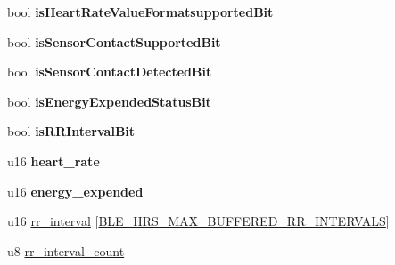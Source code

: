 \begin{DoxyCompactItemize}
\item 
bool {\bfseries is\+Heart\+Rate\+Value\+Formatsupported\+Bit}\hypertarget{struct_b_l_e___h_r_s___measurement_a223f4878ad708b9d3706e098b515df88}{}\label{struct_b_l_e___h_r_s___measurement_a223f4878ad708b9d3706e098b515df88}

\item 
bool {\bfseries is\+Sensor\+Contact\+Supported\+Bit}\hypertarget{struct_b_l_e___h_r_s___measurement_a6e348ad9f21607bbd23458659e9dd3ac}{}\label{struct_b_l_e___h_r_s___measurement_a6e348ad9f21607bbd23458659e9dd3ac}

\item 
bool {\bfseries is\+Sensor\+Contact\+Detected\+Bit}\hypertarget{struct_b_l_e___h_r_s___measurement_a19957c7b17419837dcafc8dc0b903d67}{}\label{struct_b_l_e___h_r_s___measurement_a19957c7b17419837dcafc8dc0b903d67}

\item 
bool {\bfseries is\+Energy\+Expended\+Status\+Bit}\hypertarget{struct_b_l_e___h_r_s___measurement_a955421e178d075f5c8de9811f468fa7c}{}\label{struct_b_l_e___h_r_s___measurement_a955421e178d075f5c8de9811f468fa7c}

\item 
bool {\bfseries is\+R\+R\+Interval\+Bit}\hypertarget{struct_b_l_e___h_r_s___measurement_a4a6740ed95d745f9100783726d161260}{}\label{struct_b_l_e___h_r_s___measurement_a4a6740ed95d745f9100783726d161260}

\item 
u16 {\bfseries heart\+\_\+rate}\hypertarget{struct_b_l_e___h_r_s___measurement_a44585aa6fb3b82686f36c7bb3190b4b4}{}\label{struct_b_l_e___h_r_s___measurement_a44585aa6fb3b82686f36c7bb3190b4b4}

\item 
u16 {\bfseries energy\+\_\+expended}\hypertarget{struct_b_l_e___h_r_s___measurement_aec46004c6387a90f30f7af5f9dbdb427}{}\label{struct_b_l_e___h_r_s___measurement_aec46004c6387a90f30f7af5f9dbdb427}

\item 
u16 \hyperlink{struct_b_l_e___h_r_s___measurement_a1626ff150d9577ee5ea80538e1f4f609}{rr\+\_\+interval} \mbox{[}\hyperlink{group___b_l_e___h_r_s_ga2e829f32fd9d57d18d1e8daa7956dee5}{B\+L\+E\+\_\+\+H\+R\+S\+\_\+\+M\+A\+X\+\_\+\+B\+U\+F\+F\+E\+R\+E\+D\+\_\+\+R\+R\+\_\+\+I\+N\+T\+E\+R\+V\+A\+LS}\mbox{]}
\item 
u8 \hyperlink{struct_b_l_e___h_r_s___measurement_a85fda1a6c624db2b9c838e6009f3a62e}{rr\+\_\+interval\+\_\+count}
\end{DoxyCompactItemize}


